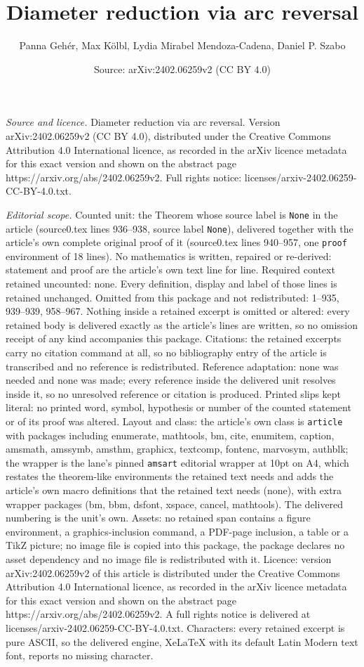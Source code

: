 \documentclass[10pt,a4paper]{amsart}
\title[Diameter reduction via arc reversal]{Diameter reduction via arc reversal}
\author{Panna Geh\'er, Max K\"olbl, Lydia Mirabel Mendoza-Cadena, Daniel P. Szabo}
\date{Source: arXiv:2402.06259v2 (CC BY 4.0)}
\begin{document}
\maketitle

\noindent\emph{Source and licence.} Diameter reduction via arc reversal. Version arXiv:2402.06259v2 (CC BY 4.0), distributed under the Creative Commons Attribution 4.0 International licence, as recorded in the arXiv licence metadata for this exact version and shown on the abstract page https://arxiv.org/abs/2402.06259v2. Full rights notice: licenses/arxiv-2402.06259-CC-BY-4.0.txt.\par\smallskip

\noindent\textit{Editorial scope.} Counted unit: the Theorem whose source label is \texttt{None} in the article (source0.tex lines 936--938, source label \texttt{None}), delivered together with the article's own complete original proof of it (source0.tex lines 940--957, one \texttt{proof} environment of 18 lines). No mathematics is written, repaired or re-derived: statement and proof are the article's own text line for line. Required context retained uncounted: none. Every definition, display and label of those lines is retained unchanged. Omitted from this package and not redistributed: 1--935, 939--939, 958--967. Nothing inside a retained excerpt is omitted or altered: every retained body is delivered exactly as the article's lines are written, so no omission receipt of any kind accompanies this package. Citations: the retained excerpts carry no citation command at all, so no bibliography entry of the article is transcribed and no reference is redistributed. Reference adaptation: none was needed and none was made; every reference inside the delivered unit resolves inside it, so no unresolved reference or citation is produced. Printed slips kept literal: no printed word, symbol, hypothesis or number of the counted statement or of its proof was altered. Layout and class: the article's own class is \texttt{article} with packages including enumerate, mathtools, bm, cite, enumitem, caption, amsmath, amssymb, amsthm, graphicx, textcomp, fontenc, marvosym, authblk; the wrapper is the lane's pinned \texttt{amsart} editorial wrapper at 10pt on A4, which restates the theorem-like environments the retained text needs and adds the article's own macro definitions that the retained text needs (none), with extra wrapper packages (bm, bbm, dsfont, xspace, cancel, mathtools). The delivered numbering is the unit's own. Assets: no retained span contains a figure environment, a graphics-inclusion command, a PDF-page inclusion, a table or a TikZ picture; no image file is copied into this package, the package declares no asset dependency and no image file is redistributed with it. Licence: version arXiv:2402.06259v2 of this article is distributed under the Creative Commons Attribution 4.0 International licence, as recorded in the arXiv licence metadata for this exact version and shown on the abstract page https://arxiv.org/abs/2402.06259v2. A full rights notice is delivered at licenses/arxiv-2402.06259-CC-BY-4.0.txt. Characters: every retained excerpt is pure ASCII, so the delivered engine, XeLaTeX with its default Latin Modern text font, reports no missing character.
\end{document}
